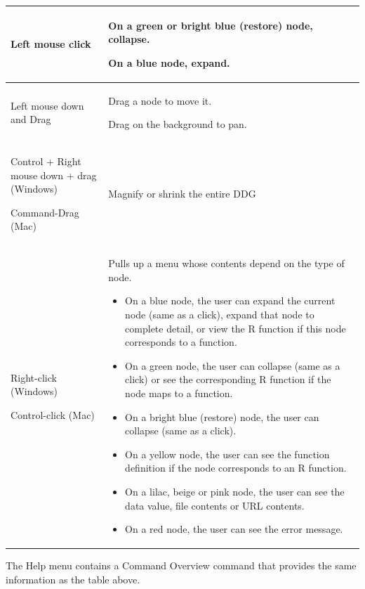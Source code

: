 \documentclass[letterpaper]{article}
\newcommand\liststyleWWviiiNumiii{%
\renewcommand\labelitemi{•}
\renewcommand\labelitemii{•}
\renewcommand\labelitemiii{•}
\renewcommand\labelitemiv{•}
}
\begin{document}
\begin{flushleft}
\tablefirsthead{}
\tablehead{}
\tabletail{}
\tablelasttail{}
\begin{supertabular}{|m{1.8073599in}|m{4.08446in}|}
\hline
{\mdseries\upshape\color{black} Left mouse click} &
{\color{black} On a green or bright blue (restore) node, collapse.}

{\color{black} On a blue node, expand.}\\\hline
{\mdseries\upshape\color{black} Left mouse down and Drag} &
{\color{black} Drag a node to move it.}

{\mdseries\upshape\color{black} Drag on the background to pan.}\\\hline
{\mdseries\upshape\color{black} Control + Right mouse down + drag (Windows)}

{\mdseries\upshape\color{black} Command-Drag (Mac)} &
{\mdseries\upshape\color{black} Magnify or shrink the entire DDG}\\\hline
{\mdseries\upshape\color{black} Right-click (Windows)}

{\mdseries\upshape\color{black} Control-click (Mac)} &
{\mdseries\upshape\color{black} Pulls up a menu whose contents depend on the type of node.}

\liststyleWWviiiNumiii
\begin{itemize}
\item {\color{black} On a blue node, the user can expand the current node (same as a click), expand that node to complete detail, or view the R function if this node corresponds to a function.}
\item {\color{black} On a green node, the user can collapse (same as a click) or see the corresponding R function if the node maps to a function.}
\item {\color{black} On a bright blue (restore) node, the user can collapse (same as a click).}
\item {\color{black} On a yellow node, the user can see the function definition if the node corresponds to an R function.}
\item {\color{black} On a lilac, beige or pink node, the user can see the data value, file contents or URL contents.}
\item {\color{black} On a red node, the user can see the error message.}
\end{itemize}
\\\hline
\end{supertabular}
\end{flushleft}
{\mdseries\upshape\color{black}
The Help menu contains a Command Overview command that provides the same information as the table above.}
\end{document}
